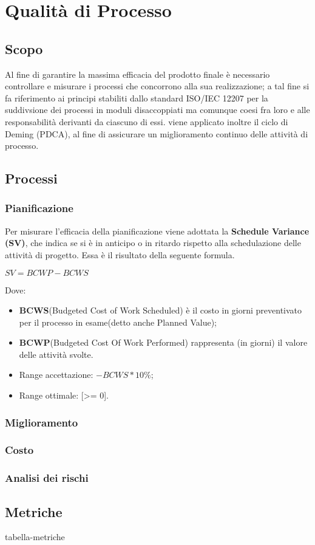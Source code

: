 \chapter{Qualità di Processo}
\label{processo} 
\section{Scopo}
Al fine di garantire la massima efficacia del prodotto finale è necessario controllare e misurare i processi che concorrono alla sua realizzazione; a tal fine si fa riferimento ai principi stabiliti dallo standard ISO/IEC 12207 per la suddivsione dei processi in moduli disaccoppiati ma comunque coesi fra loro e alle responsabilità derivanti da ciascuno di essi.
viene applicato inoltre il ciclo di Deming (PDCA), al fine di assicurare un miglioramento continuo delle attività di processo. 

\section{Processi}

\subsection{Pianificazione}
Per misurare l'efficacia della pianificazione viene adottata la \textbf{Schedule Variance (SV)}, che indica se si è in anticipo o in ritardo rispetto alla schedulazione delle attività di progetto.
Essa è il risultato della seguente formula.\\
\begin{center}
	\begin{math}
	SV = BCWP - BCWS
	\end{math}
\end{center}
Dove:
\begin{itemize}
	\item[] \textbf{BCWS}\label{bcws}(Budgeted Cost of Work Scheduled) è il costo in giorni preventivato per il processo in esame(detto anche Planned Value);
	\item[] \textbf{BCWP}\label{bcwp}(Budgeted Cost Of Work Performed) rappresenta (in giorni) il valore delle attività svolte.
\end{itemize}

\begin{itemize}
	\item Range accettazione: $-BCWS *10\%$;
	\item Range ottimale: [>= 0].
\end{itemize}



\subsection{Miglioramento}
\subsection{Costo}
\subsection{Analisi dei rischi}
\section{Metriche}
tabella-metriche